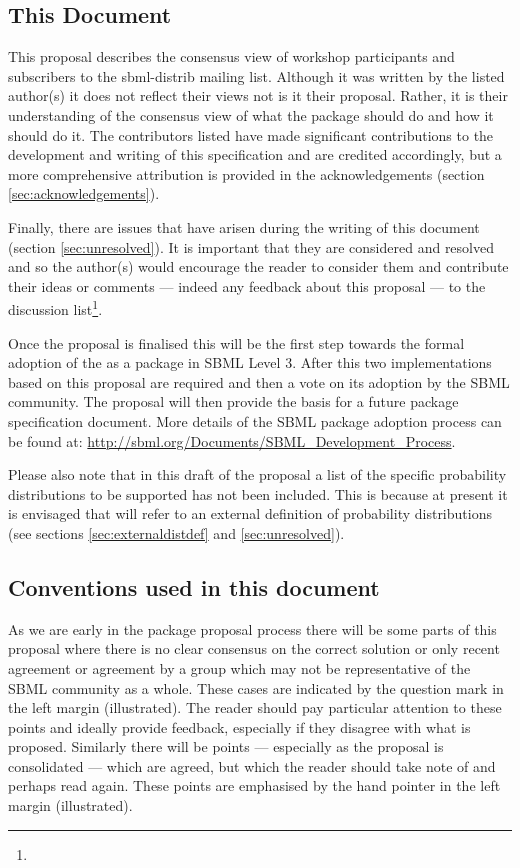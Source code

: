 \documentclass[draftspec]{sbmlpkgspec}
\begin{document}
\subsection{This Document}

This proposal describes the consensus view of workshop participants
and subscribers to the sbml-distrib mailing list. Although it was
written by the listed author(s) it does not reflect their views not is
it their proposal. Rather, it is their understanding of the consensus
view of what the \distrib package should do and how it should do
it. The contributors listed have made significant contributions to the
development and writing of this specification and are credited
accordingly, but a more comprehensive attribution is provided in the
acknowledgements (section \ref{sec:acknowledgements}).

Finally, there are issues that have arisen during the writing of this
document (section \ref{sec:unresolved}). It is important that they are
considered and resolved and so the author(s) would encourage the
reader to consider them and contribute their ideas or comments ---
indeed any feedback about this proposal --- to the \distribshort
discussion list\footnote{}.

Once the proposal is finalised this will be the first step towards the
formal adoption of the \distribshort as a package in SBML Level
3. After this two implementations based on this proposal are required
and then a vote on its adoption by the SBML community. The proposal
will then provide the basis for a future package specification
document. More details of the SBML package adoption process can be
found at: \url{http://sbml.org/Documents/SBML_Development_Process}.

Please also note that in this draft of the proposal a list of the
specific probability distributions to be supported has not been
included. This is because at present it is envisaged that
\distribshort will refer to an external definition of probability
distributions (see sections \ref{sec:externaldistdef} and
\ref{sec:unresolved}).

\subsection{Conventions used in this document}

As we are early in the package proposal process there will be some
parts of this proposal where there is no clear consensus on the
correct solution or only recent agreement or agreement by a group
which may not be representative of the SBML community as a
whole. These cases are indicated by the \contraversial question mark
in the left margin (illustrated). The reader should pay particular
attention to these points and ideally provide feedback, especially if
they disagree with what is proposed. Similarly there will be points
--- especially as the proposal is consolidated --- which are agreed,
but which the reader should take note of and perhaps read again. These
points \watchout are emphasised by the hand pointer in the left margin
(illustrated).
\end{document}
